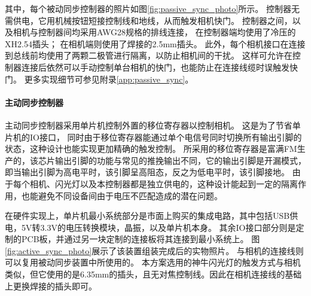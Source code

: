 其中，每个被动同步控制器的照片如图\ref{fig:passive_sync_photo}所示。
控制器无需供电，它用机械按钮短接控制线和地线，从而触发相机快门。
控制器之间，以及相机与控制器间均采用AWG28规格的排线连接，
在控制器端均使用了冷压的XH2.54插头；
在相机端则使用了焊接的2.5mm插头。
此外，每个相机接口在连接到总线前均使用了两颗二极管进行隔离，以防止相机间的干扰。
这样可允许在控制器连接后依然可以手动控制单台相机的快门，也能防止在连接线缆时误触发快门。
更多实现细节可参见附录\ref{app:passive_sync}。

\paragraph{主动同步控制器}
主动同步控制器采用单片机控制外置的移位寄存器以控制相机。
这是为了节省单片机的IO接口，
同时由于移位寄存器能通过单个电信号同时切换所有输出引脚的状态，这种设计也能实现更加精确的触发控制。
所采用的移位寄存器是富满FM生产的，该芯片输出引脚的功能与常见的推挽输出不同，它的输出引脚是开漏模式，
即当输出引脚为高电平时，该引脚呈高阻态，反之为低电平时，该引脚接地。
由于每个相机、闪光灯以及本控制器都是独立供电的，这种设计能起到一定的隔离作用，也能避免不同设备间由于电压不匹配造成的潜在问题。

在硬件实现上，单片机最小系统部分是市面上购买的集成电路，其中包括USB供电，5V转3.3V的电压转换模块，晶振，以及单片机本身。
其余IO接口部分则是定制的PCB板，并通过另一块定制的连接板将其连接到最小系统上。
图\ref{fig:active_sync_photo}展示了该装置组装完成后的实物照片。
与相机的连接线则可以复用被动同步装置中所使用的。
本方案选用的神牛闪光灯的触发方式与相机类似，但它使用的是6.35mm的插头，且无对焦控制线。因此在相机连接线的基础上更换焊接的插头即可。


